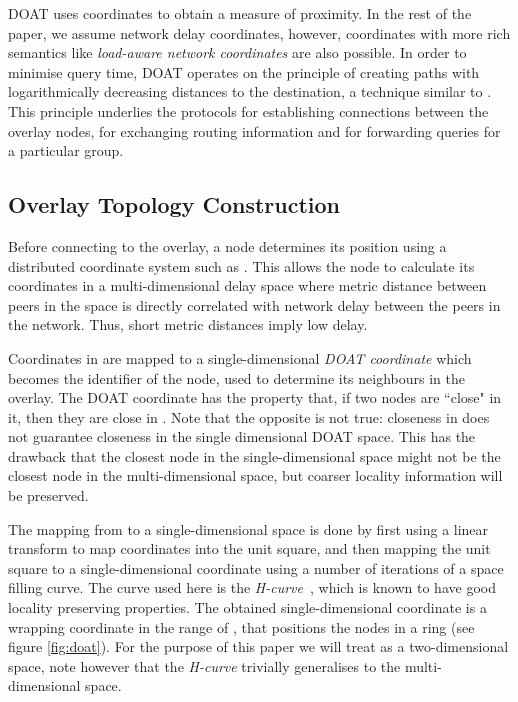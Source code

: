 
DOAT uses coordinates to obtain a measure of proximity. In the rest of the paper,
we assume network delay coordinates, however, coordinates
with more rich semantics like \emph{load-aware network coordinates} \cite{LANC}
are also possible. 
In order to minimise query time, DOAT operates on the principle of creating
paths with logarithmically decreasing distances to the destination, a
technique similar to \cite{stoicachord}. This principle underlies the
protocols for establishing connections between the overlay nodes, 
for exchanging routing information and for
forwarding queries for a particular group. 


\subsection{Overlay Topology Construction}
\label{subsect:neighbors}
Before connecting to the overlay, a node determines its position
using a distributed coordinate system such as \cite{vivaldi}.  This
allows the node to calculate its coordinates
in a multi-dimensional delay space  where metric distance
between peers in the space is directly correlated with
network delay between the peers in the network. Thus, short metric
distances imply low delay.

Coordinates in
 are mapped to a single-dimensional \emph{DOAT coordinate}
which becomes the identifier of the node, used to determine its neighbours in
the overlay.
The DOAT
coordinate has the property that, if two nodes are ``close" in it, 
then they are close in . 
Note that the opposite is not true: closeness in
 does not guarantee closeness in the single dimensional DOAT
space. This has the drawback that the closest node in the single-dimensional 
space might not be the closest node in the multi-dimensional
space, but coarser locality information will be preserved.

The mapping from   to a 
single-dimensional space is done by
first using a linear transform to map  coordinates into the
unit square, and
then mapping the unit square to a single-dimensional coordinate using a number of
iterations
of a space filling curve.  The curve used here is the
\emph{H-curve}~\cite{hcurve}, which is known
to have good locality preserving properties.
The obtained single-dimensional coordinate is a wrapping coordinate in the
range of , that positions the nodes in a ring 
(see figure \ref{fig:doat}).
For the purpose of this paper we will treat  as a
two-dimensional space, note however that the \emph{H-curve} trivially generalises 
to the multi-dimensional space.


